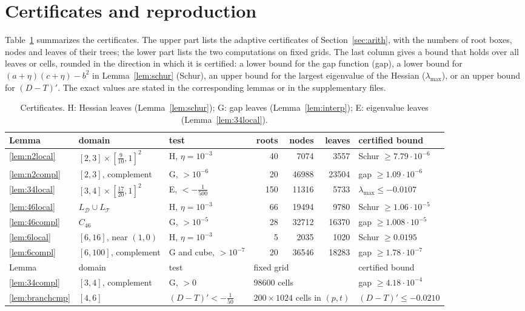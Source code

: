 \documentclass[11pt]{amsart}
\theoremstyle{definition}
\theoremstyle{remark}
\numberwithin{equation}{section}
\newcommand{\cD}{\mathcal{D}}
\newcommand{\cT}{\mathcal{T}}
\begin{document}
\section{Certificates and reproduction}\label{app:data}

Table~\ref{tab:certs} summarizes the certificates. The upper part lists the adaptive certificates of Section~\ref{sec:arith}, with the numbers of root boxes, nodes and leaves of their trees; the lower part lists the two computations on fixed grids. The last column gives a bound that holds over all leaves or cells, rounded in the direction in which it is certified: a lower bound for the gap function (gap), a lower bound for $(a+\eta)(c+\eta)-b^2$ in Lemma~\ref{lem:schur} (Schur), an upper bound for the largest eigenvalue of the Hessian ($\lambda_{\max}$), or an upper bound for $(D-T)'$. The exact values are stated in the corresponding lemmas or in the supplementary files.

\begin{table}[ht]
\caption{Certificates. H: Hessian leaves (Lemma~\ref{lem:schur}); G: gap leaves (Lemma~\ref{lem:interp}); E: eigenvalue leaves (Lemma~\ref{lem:34local}).}\label{tab:certs}
\small
\begin{tabular}{@{}lllrrrl@{}}
\toprule
Lemma & domain & test & roots & nodes & leaves & certified bound\\
\midrule
\ref{lem:n2local} & $[2,3]\times[\frac9{10},1]^2$ & H, $\eta=10^{-3}$ & 40 & 7074 & 3557 & Schur $\ge7.79\cdot10^{-6}$\\
\ref{lem:n2compl} & $[2,3]$, complement & G, $>10^{-6}$ & 20 & 46988 & 23504 & gap $\ge1.09\cdot10^{-6}$\\
\ref{lem:34local} & $[3,4]\times[\frac{17}{20},1]^2$ & E, $<-\frac1{500}$ & 150 & 11316 & 5733 & $\lambda_{\max}\le-0.0107$\\
\ref{lem:46local} & $L_\cD\cup L_\cT$ & H, $\eta=10^{-3}$ & 66 & 19494 & 9780 & Schur $\ge1.06\cdot10^{-5}$\\
\ref{lem:46compl} & $C_{46}$ & G, $>10^{-5}$ & 28 & 32712 & 16370 & gap $\ge1.008\cdot10^{-5}$\\
\ref{lem:6local} & $[6,16]$, near $(1,0)$ & H, $\eta=10^{-3}$ & 5 & 2035 & 1020 & Schur $\ge0.0195$\\
\ref{lem:6compl} & $[6,100]$, complement & G and cube, $>10^{-7}$ & 20 & 36546 & 18283 & gap $\ge1.78\cdot10^{-7}$\\
\midrule
Lemma & domain & test & \multicolumn{3}{l}{fixed grid} & certified bound\\
\midrule
\ref{lem:34compl} & $[3,4]$, complement & G, $>0$ & \multicolumn{3}{l}{$98600$ cells} & gap $\ge4.18\cdot10^{-4}$\\
\ref{lem:branchcmp} & $[4,6]$ & $(D-T)'<-\frac1{50}$ & \multicolumn{3}{l}{$200\times1024$ cells in $(p,t)$} & $(D-T)'\le-0.0210$\\
\bottomrule
\end{tabular}
\end{table}
\end{document}
